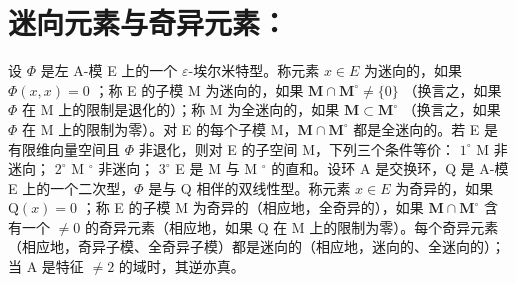 \section*{迷向元素与奇异元素：}

设 \(\Phi\) 是左 A-模 E 上的一个 \(\varepsilon\)-埃尔米特型。称元素 \(x \in E\) 为迷向的，如果 \(\Phi(x, x) = 0\) ；称 E 的子模 M 为迷向的，如果 \(\mathbf{M} \cap \mathbf{M}^{\circ} \neq \{0\}\) （换言之，如果 \(\Phi\) 在 M 上的限制是退化的）；称 M 为全迷向的，如果 \(\mathbf{M} \subset \mathbf{M}^{\circ}\) （换言之，如果 \(\Phi\) 在 M 上的限制为零）。对 E 的每个子模 M，\(\mathbf{M} \cap \mathbf{M}^{\circ}\) 都是全迷向的。若 E 是有限维向量空间且 \(\Phi\) 非退化，则对 E 的子空间 M，下列三个条件等价： \(1^{\circ}\) M 非迷向； \(2^{\circ}\) M \(^{\circ}\) 非迷向； \(3^{\circ}\) E 是 M 与 M \(^{\circ}\) 的直和。设环 A 是交换环，Q 是 A-模 E 上的一个二次型，\(\Phi\) 是与 Q 相伴的双线性型。称元素 \(x \in E\) 为奇异的，如果 \(\mathrm{Q}(x) = 0\) ；称 E 的子模 M 为奇异的（相应地，全奇异的），如果 \(\mathbf{M} \cap \mathbf{M}^{\circ}\) 含有一个 \(\neq 0\) 的奇异元素（相应地，如果 Q 在 M 上的限制为零）。每个奇异元素（相应地，奇异子模、全奇异子模）都是迷向的（相应地，迷向的、全迷向的）；当 A 是特征 \(\neq 2\) 的域时，其逆亦真。
